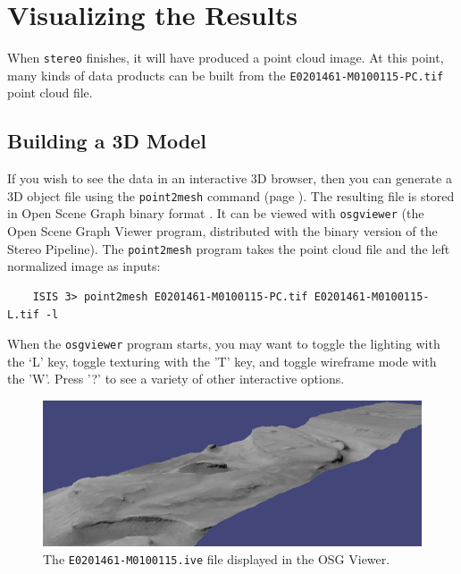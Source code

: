 \section{Visualizing the Results}

When \texttt{stereo} finishes, it will have produced a point cloud
image.  At this point, many kinds of data products can be built from
the \texttt{E0201461-M0100115-PC.tif} point cloud file.

\subsection{Building a 3D Model}

If you wish to see the data in an interactive 3D browser, then you can
generate a 3D object file using the \texttt{point2mesh} command (page
\pageref{point2mesh}). The resulting file is stored in Open Scene
Graph binary format \cite{OSG_website}.  It can be viewed with
\texttt{osgviewer} (the Open Scene Graph Viewer program, distributed
with the binary version of the Stereo Pipeline).  The
\texttt{point2mesh} program takes the point cloud file and the left
normalized image as inputs:

\begin{verbatim}
    ISIS 3> point2mesh E0201461-M0100115-PC.tif E0201461-M0100115-L.tif -l
\end{verbatim}

\noindent
When the \texttt{osgviewer} program starts, you may want to toggle the
lighting with the `L' key, toggle texturing with the 'T' key, and
toggle wireframe mode with the 'W'.  Press '?' to see a variety of
other interactive options.

\begin{figure}[t]
\begin{minipage}{5in}
\includegraphics[width=5in]{images/p19-osg.png}
\end{minipage}
\hfill
\begin{minipage}{1.7in}
\caption[P19 in OSG]{
    \label{p19-osg}
	The \texttt{E0201461-M0100115.ive} file displayed in the OSG
        Viewer.  }
\end{minipage}
\end{figure}

